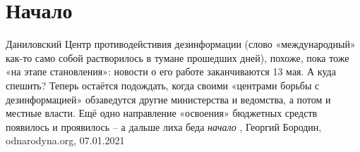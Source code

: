  
 
 
 
 
\chapter{Начало}
\label{sec:slova.nachalo}

Даниловский Центр противодейстивия дезинформации (слово «международный» как-то
само собой растворилось в тумане прошедших дней), похоже, пока тоже «на этапе
становления»: новости о его работе заканчиваются 13 мая. А куда спешить?
Теперь остаётся подождать, когда своими «центрами борьбы с дезинформацией»
обзаведутся другие министерства и ведомства, а потом и местные власти. Ещё одно
направление «освоения» бюджетных средств появилось и проявилось – а дальше лиха
беда \emph{начало}
, Георгий Бородин, odnarodyna.org, 07.01.2021
